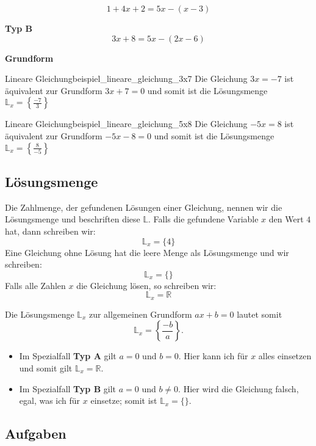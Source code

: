 $$1+4x+2 = 5x - (x-3)$$

\textbf{Typ B}\\

$$3x+8 = 5x-(2x-6)$$

\textbf{Grundform}\\

\begin{beispiel}{Lineare Gleichung}{beispiel_lineare_gleichung_3x7}
  Die Gleichung $3x=-7$ ist äquivalent zur Grundform $3x+7=0$ und somit ist die Lösungsmenge $\mathbb{L}_x=\left\{ \frac{-7}{3}  \right\}$
  \end{beispiel}

\begin{beispiel}{Lineare Gleichung}{beispiel_lineare_gleichung_5x8}
  Die Gleichung $-5x=8$ ist äquivalent zur Grundform $-5x-8=0$ und somit ist die Lösungsmenge $\mathbb{L}_x=\left\{ \frac{8}{-5}  \right\}$
\end{beispiel}
\newpage


\subsection{Lösungsmenge}
  Die Zahlmenge, der gefundenen Lösungen einer Gleichung, nennen wir
  die Lösungsmenge und beschriften diese $\mathbb{L}$. Falls die gefundene
  Variable $x$ \zB{} den Wert $4$ hat, dann schreiben wir:
  $$\mathbb{L}_x=\{4\}$$
  Eine Gleichung ohne Lösung hat die leere Menge als Lösungsmenge und
  wir schreiben:
  $$\mathbb{L}_x=\{\}$$
  Falls alle Zahlen $x$ die Gleichung lösen, so schreiben wir:
  $$\mathbb{L}_x=\mathbb{R}$$

  

Die Lösungsmenge $\mathbb{L}_x$ zur allgemeinen Grundform $ax+b=0$ lautet somit $$\mathbb{L}_x=\left\{ \frac{-b}{a} \right\}.$$

\begin{itemize}
  \item Im Spezialfall \textbf{Typ A} gilt $a=0$ und $b=0$. Hier kann ich für $x$ alles einsetzen und somit gilt $\mathbb{L}_x=\mathbb{R}$.
  \item Im Spezialfall \textbf{Typ B} gilt $a=0$ und $b\ne 0$. Hier wird die Gleichung falsch, egal, was ich für $x$ einsetze; somit ist $\mathbb{L}_x=\{\}$.
\end{itemize}

\subsection*{Aufgaben}
\newpage
